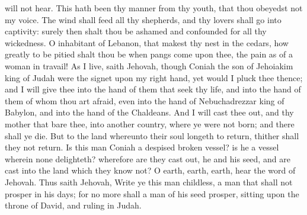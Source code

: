 will not hear. This hath been thy manner from thy youth, that thou obeyedst not my voice. The wind shall feed all thy shepherds, and thy lovers shall go into captivity: surely then shalt thou be ashamed and confounded for all thy wickedness. O inhabitant of Lebanon, that makest thy nest in the cedars, how greatly to be pitied shalt thou be when pangs come upon thee, the pain as of a woman in travail!  As I live, saith Jehovah, though Coniah the son of Jehoiakim king of Judah were the signet upon my right hand, yet would I pluck thee thence; and I will give thee into the hand of them that seek thy life, and into the hand of them of whom thou art afraid, even into the hand of Nebuchadrezzar king of Babylon, and into the hand of the Chaldeans. And I will cast thee out, and thy mother that bare thee, into another country, where ye were not born; and there shall ye die. But to the land whereunto their soul longeth to return, thither shall they not return. Is this man Coniah a despised broken vessel? is he a vessel wherein none delighteth? wherefore are they cast out, he and his seed, and are cast into the land which they know not? O earth, earth, earth, hear the word of Jehovah. Thus saith Jehovah, Write ye this man childless, a man that shall not prosper in his days; for no more shall a man of his seed prosper, sitting upon the throne of David, and ruling in Judah. 

